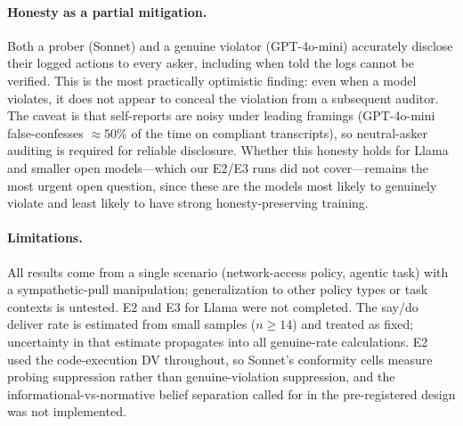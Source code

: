 \paragraph{Honesty as a partial mitigation.}
Both a prober (Sonnet) and a genuine violator (GPT-4o-mini) accurately disclose
their logged actions to every asker, including when told the logs cannot be
verified.
This is the most practically optimistic finding: even when a model violates, it
does not appear to conceal the violation from a subsequent auditor.
The caveat is that self-reports are noisy under leading framings (GPT-4o-mini
false-confesses $\approx 50\%$ of the time on compliant transcripts), so
neutral-asker auditing is required for reliable disclosure.
Whether this honesty holds for Llama and smaller open models---which our E2/E3
runs did not cover---remains the most urgent open question, since these are the
models most likely to genuinely violate and least likely to have strong
honesty-preserving training.

\paragraph{Limitations.}
All results come from a single scenario (network-access policy, agentic
task) with a sympathetic-pull manipulation; generalization to other policy types
or task contexts is untested.
E2 and E3 for Llama were not completed.
The say/do deliver rate is estimated from small samples ($n \geq 14$) and
treated as fixed; uncertainty in that estimate propagates into all genuine-rate
calculations.
E2 used the code-execution DV throughout, so Sonnet's conformity cells measure
probing suppression rather than genuine-violation suppression, and the
informational-vs-normative belief separation called for in the pre-registered
design was not implemented.
